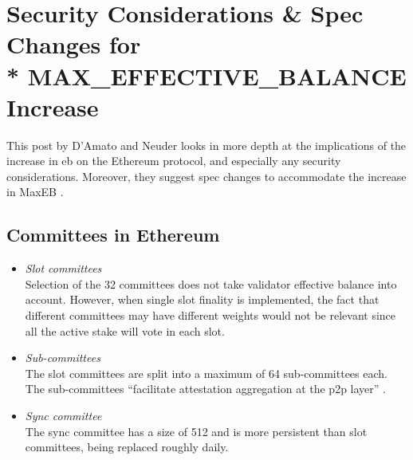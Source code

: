 \documentclass{article}
\begin{document}
\section{Security Considerations \& Spec Changes for \\*
MAX\_EFFECTIVE\_BALANCE Increase}
\label{sec:security} This post by D'Amato and Neuder looks in more depth at the
implications of the increase in \gls{eb} on the Ethereum protocol, and
especially any security considerations. Moreover, they suggest spec changes to
accommodate the increase in MaxEB \cite{damato2023}. 

\subsection{Committees in Ethereum}
\begin{itemize}
  \item \textit{Slot committees}\\
    Selection of the 32 committees does not take validator effective balance
    into account. However, when single slot finality is implemented, the fact
    that different committees may have different weights would not be relevant
    since all the active stake will vote in each slot.   
  \item \textit{Sub-committees} \\
    The slot committees are split into a maximum of 64 sub-committees each. The
    sub-committees ``facilitate attestation aggregation at the p2p layer''
    \cite{damato2023}. 
  \item \textit{Sync committee} \\
    The sync committee has a size of 512 and is more persistent than slot
    committees, being replaced roughly daily. 
\end{itemize}
\end{document}
